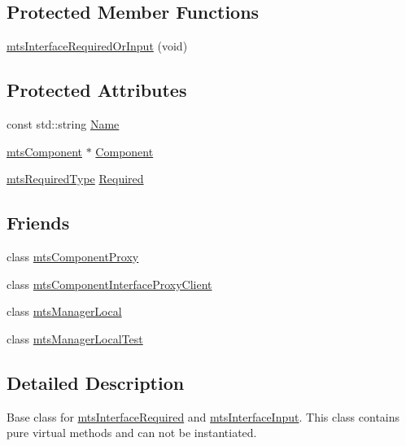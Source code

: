 \subsection*{Protected Member Functions}
\begin{DoxyCompactItemize}
\item 
\hyperlink{classmts_interface_required_or_input_a032937ad6ca36250fe619745c7da4589}{mts\+Interface\+Required\+Or\+Input} (void)
\end{DoxyCompactItemize}
\subsection*{Protected Attributes}
\begin{DoxyCompactItemize}
\item 
const std\+::string \hyperlink{classmts_interface_required_or_input_aeaaf350b344d0b697b19c6f642b67317}{Name}
\item 
\hyperlink{classmts_component}{mts\+Component} $\ast$ \hyperlink{classmts_interface_required_or_input_a671dde64d1580dde3b87a8fc97ac9462}{Component}
\item 
\hyperlink{mts_forward_declarations_8h_a9ef1ce54724afde7802db326ff8606f3}{mts\+Required\+Type} \hyperlink{classmts_interface_required_or_input_ac0ae074f8fe197420257c16e1f0f7db2}{Required}
\end{DoxyCompactItemize}
\subsection*{Friends}
\begin{DoxyCompactItemize}
\item 
class \hyperlink{classmts_interface_required_or_input_a744ae66bbeeeba6ef38e59a2dd5e9743}{mts\+Component\+Proxy}
\item 
class \hyperlink{classmts_interface_required_or_input_a18fd56a8a436d449d0b4cfd44835f821}{mts\+Component\+Interface\+Proxy\+Client}
\item 
class \hyperlink{classmts_interface_required_or_input_a31c1c611dbb103ac58ed40d84960baa0}{mts\+Manager\+Local}
\item 
class \hyperlink{classmts_interface_required_or_input_adc2ae8db48d5418c526f275aafa3d4a9}{mts\+Manager\+Local\+Test}
\end{DoxyCompactItemize}


\subsection{Detailed Description}
Base class for \hyperlink{classmts_interface_required}{mts\+Interface\+Required} and \hyperlink{classmts_interface_input}{mts\+Interface\+Input}. This class contains pure virtual methods and can not be instantiated. 

